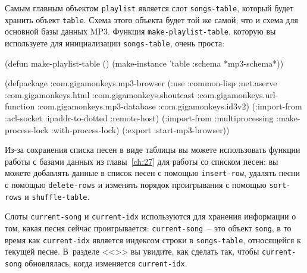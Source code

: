 Самым главным объектом \lstinline{playlist} является слот \lstinline{songs-table}, который будет
хранить объект \lstinline{table}.  Схема этого объекта будет той же самой, что и схема для
основной базы данных MP3.  Функция \lstinline{make-playlist-table}, которую вы используете для
инициализации \lstinline{songs-table}, очень проста:

\begin{myverb}
(defun make-playlist-table ()
  (make-instance 'table :schema *mp3-schema*))
\end{myverb}

\begin{lrbox}{\chtwonineone}
  \begin{minipage}{\linewidth}
\begin{myverb}
(defpackage :com.gigamonkeys.mp3-browser
  (:use :common-lisp
        :net.aserve
        :com.gigamonkeys.html
        :com.gigamonkeys.shoutcast
        :com.gigamonkeys.url-function
        :com.gigamonkeys.mp3-database
        :com.gigamonkeys.id3v2)
  (:import-from :acl-socket
                :ipaddr-to-dotted
                :remote-host)
  (:import-from :multiprocessing
                :make-process-lock
                :with-process-lock)
  (:export :start-mp3-browser))
\end{myverb}
  \end{minipage}
\end{lrbox}


Из-за сохранения списка песен в виде таблицы вы можете использовать функции работы с
базами данных из главы~\ref{ch:27} для работы со списком песен: вы можете добавлять данные
в список песен с помощью \lstinline{insert-row}, удалять песни с помощью \lstinline{delete-rows} и
изменять порядок проигрывания с помощью \lstinline{sort-rows} и \lstinline{shuffle-table}.

Слоты \lstinline{current-song} и \lstinline{current-idx} используются для хранения информации о том,
какая песня сейчас проигрывается: \lstinline{current-song}~-- это объект \lstinline{song}, в то
время как \lstinline{current-idx} является индексом строки в \lstinline{songs-table}, относящейся к
текущей песне. В~разделе <<>> вы увидите, как сделать так, чтобы
\lstinline{current-song} обновлялась, когда изменяется \lstinline{current-idx}.

